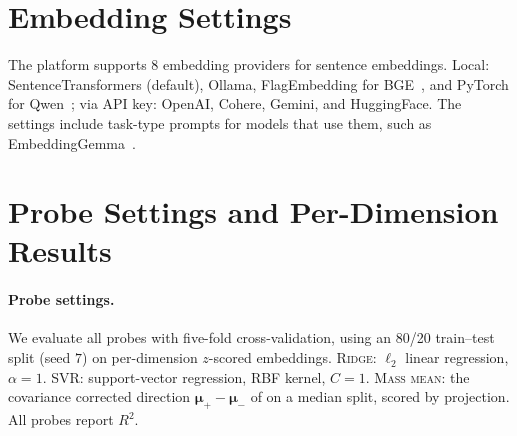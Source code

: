 \documentclass[11pt]{article}
\begin{document}
\section{Embedding Settings}
\label{app:embedding}

The platform supports 8 embedding providers for sentence embeddings. Local: SentenceTransformers (default), Ollama, FlagEmbedding for BGE~\cite{chen-etal-2024-m3}, and PyTorch for Qwen~\cite{zhang2025qwen3embeddingadvancingtext}; via API key: OpenAI, Cohere, Gemini, and HuggingFace. The settings include task-type prompts for models that use them, such as EmbeddingGemma~\cite{vera2025embeddinggemmapowerfullightweighttext}. 


\section{Probe Settings and Per-Dimension Results}
\label{app:probes}

\paragraph{Probe settings.}
We evaluate all probes with five-fold cross-validation, using an 80/20 train–test split (seed $7$) on per-dimension $z$-scored embeddings. \textsc{Ridge}: $\ell_2$ linear regression, $\alpha=1$. \textsc{SVR}: support-vector regression, RBF kernel, $C=1$. \textsc{Mass mean}: the covariance corrected direction $\boldsymbol{\mu}_{+}-\boldsymbol{\mu}_{-}$ of \citet{Marks2023TheGO} on a median split, scored by projection. All probes report $R^2$. 
\end{document}
